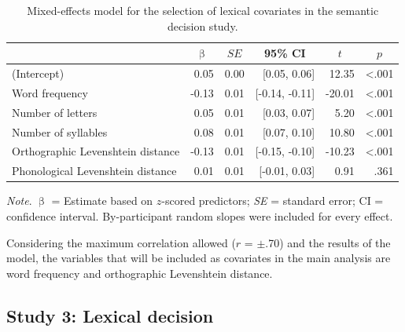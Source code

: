 \documentclass[
  12pt,
  man,floatsintext]{apa7}
\begin{document}
\begin{table}[!h]

\caption{\label{tab:semanticdecision-lexical-covariates-selection}Mixed-effects model for the selection of lexical covariates in the semantic decision study.}
\centering
\begin{threeparttable}
\begin{tabular}[t]{lrrrrr}
\toprule
\multicolumn{1}{c}{ } & \multicolumn{1}{c}{$\upbeta$} & \multicolumn{1}{c}{$SE$} & \multicolumn{1}{c}{95\% CI} & \multicolumn{1}{c}{$t$} & \multicolumn{1}{c}{$p$}\\
\midrule
(Intercept) & 0.05 & 0.00 & {}[0.05, 0.06] & 12.35 & <.001\\
Word frequency & -0.13 & 0.01 & {}[-0.14, -0.11] & -20.01 & <.001\\
Number of letters & 0.05 & 0.01 & {}[0.03, 0.07] & 5.20 & <.001\\
Number of syllables & 0.08 & 0.01 & {}[0.07, 0.10] & 10.80 & <.001\\
Orthographic Levenshtein distance & -0.13 & 0.01 & {}[-0.15, -0.10] & -10.23 & <.001\\
Phonological Levenshtein distance & 0.01 & 0.01 & {}[-0.01, 0.03] & 0.91 & .361\\
\bottomrule
\end{tabular}
\begin{tablenotes}
\item \textit{\linebreak} 
\item \textit{Note}. $\upbeta$ = Estimate based on $z$-scored predictors; \textit{SE} = standard error; \linebreak \phantom{.}CI = confidence interval. By-participant random slopes were included for \linebreak \phantom{.}every effect.
\end{tablenotes}
\end{threeparttable}
\end{table}

Considering the maximum correlation allowed (\(r\) = \(\pm\).70) and the results of the model, the variables that will be included as covariates in the main analysis are word frequency and orthographic Levenshtein distance.

\hypertarget{study-3-lexical-decision}{%
\subsection{Study 3: Lexical decision}\label{study-3-lexical-decision}}
\end{document}
